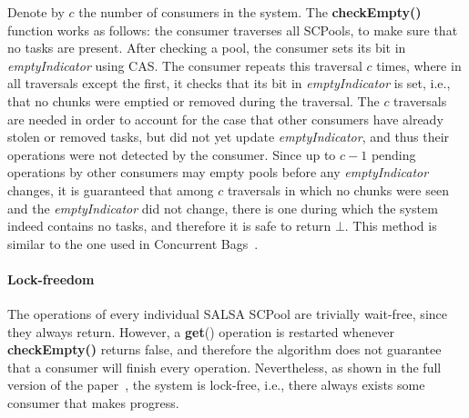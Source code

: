 Denote by $c$ the number of consumers in the system. The {\bf checkEmpty()} function works as follows: the consumer traverses all SCPools, to make sure that no tasks are present. After checking a pool, the consumer sets its bit in \emph{emptyIndicator} using CAS. The consumer repeats this traversal $c$ times, where in all traversals except the first, it checks that its bit in \emph{emptyIndicator} is set, i.e., that no chunks were emptied or removed during the traversal. The $c$ traversals are needed in order to account for the case that other consumers have already stolen or removed tasks, but did not yet update \emph{emptyIndicator}, and thus their operations were not detected by the consumer. Since up to $c-1$ pending operations by other consumers may empty pools before any \emph{emptyIndicator} changes, it is guaranteed that among $c$ traversals in which no chunks were seen and the \emph{emptyIndicator} did not change, there is one during which the system indeed contains no tasks, and therefore it is safe to return $\bot$. This method is similar to the one used in Concurrent Bags~\cite{Sundell:2011:LAC:1989493.1989550}.

\paragraph{Lock-freedom}
The operations of every individual SALSA SCPool are trivially wait-free, since they always return. However, a {\bf get}() operation is restarted whenever {\bf checkEmpty()} returns false, and therefore the algorithm does not guarantee that a consumer will finish every operation. Nevertheless, as shown in the full version of the paper~\cite{salsa-tech-rep}, the system is lock-free, i.e., there always exists some consumer that makes progress.
%
